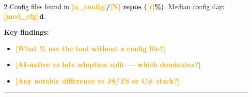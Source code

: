 \documentclass[10pt,a4paper]{article}
\newcommand{\FILLIN}[1]{\textcolor{orange}{\textbf{[#1]}}}
\begin{document}
\begin{multicols}{2}
\vspace{2pt}
Config files found in \textbf{\FILLIN{n\_config}/\FILLIN{N} repos (\FILLIN{r}\%)}.
Median config day: \textbf{\FILLIN{med\_cfg}\,d}.

\vspace{3pt}
\textbf{Key findings:}
\begin{itemize}\setlength\itemsep{0pt}
  \item \FILLIN{What \% use the tool without a config file?}
  \item \FILLIN{AI-native vs late adoption split — which dominates?}
  \item \FILLIN{Any notable difference vs JS/TS or C\# stack?}
\end{itemize}

\end{multicols}

\vspace{4pt}
\hrule
\vspace{4pt}
\end{document}
